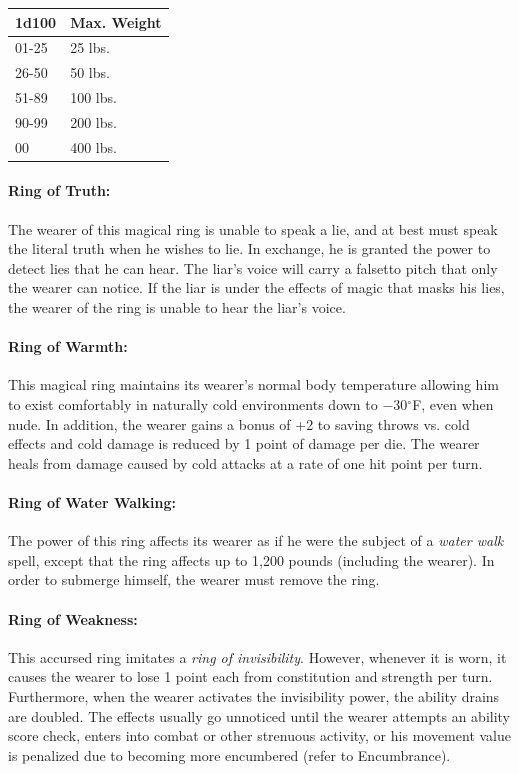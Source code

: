 \begin{multicols}{2}
\noindent
\begin{tabular}{|p{}|p{}|}
\hline
1d100	& Max. Weight \\
\hline\hline
\rowcolor[gray]{.9}01-25	& 25 lbs. \\
26-50	& 50 lbs. \\
\rowcolor[gray]{.9}51-89	& 100 lbs. \\
90-99	& 200 lbs. \\
\rowcolor[gray]{.9}00	& 400 lbs. \\
\hline
\end{tabular}

\paragraph{Ring of Truth:} The wearer of this magical ring is unable to speak a lie, and at best must speak the literal truth when he wishes to lie.  In exchange, he is granted the power to detect lies that he can hear.  The liar's voice will carry a falsetto pitch that only the wearer can notice.  If the liar is under the effects of magic that masks his lies, the wearer of the ring is unable to hear the liar's voice.  

\paragraph{Ring of Warmth:} This magical ring maintains its wearer's normal body temperature allowing him to exist comfortably in naturally cold environments down to $-30$$^\circ$F, even when nude.  In addition, the wearer gains a bonus of +2 to saving throws vs. cold effects and cold damage is reduced by 1 point of damage per die.  The wearer heals from damage caused by cold attacks at a rate of one hit point per turn.

\paragraph{Ring of Water Walking:} The power of this ring affects its wearer as if he were the subject of a \textit{water walk} spell, except that the ring affects up to 1,200 pounds (including the wearer).  In order to submerge himself, the wearer must remove the ring.
 
\paragraph{Ring of Weakness:} This accursed ring imitates a \textit{ring of invisibility}.  However, whenever it is worn, it causes the wearer to lose 1 point each from constitution and strength per turn.  Furthermore, when the wearer activates the invisibility power, the ability drains are doubled.  The effects usually go unnoticed until the wearer attempts an ability score check, enters into combat or other strenuous activity, or his movement value is penalized due to becoming more encumbered (refer to Encumbrance).  


\end{multicols}
